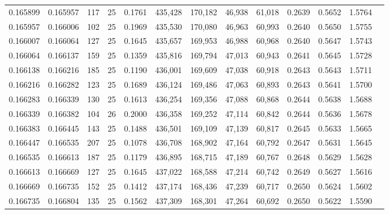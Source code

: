 \begin{tabular}{rrrrrrrrrrrrr}
0.165899 & 0.165957 &   117 &  25 &                                     0.1761 & 435,428 & 170,182 &  46,938 &  61,018 & 0.2639 & 0.5652 & 1.5764 \\
0.165957 & 0.166006 &   102 &  25 &                                     0.1969 & 435,530 & 170,080 &  46,963 &  60,993 & 0.2640 & 0.5650 & 1.5755 \\
0.166007 & 0.166064 &   127 &  25 &                                     0.1645 & 435,657 & 169,953 &  46,988 &  60,968 & 0.2640 & 0.5647 & 1.5743 \\
0.166064 & 0.166137 &   159 &  25 &                                     0.1359 & 435,816 & 169,794 &  47,013 &  60,943 & 0.2641 & 0.5645 & 1.5728 \\
0.166138 & 0.166216 &   185 &  25 &                                     0.1190 & 436,001 & 169,609 &  47,038 &  60,918 & 0.2643 & 0.5643 & 1.5711 \\
0.166216 & 0.166282 &   123 &  25 &                                     0.1689 & 436,124 & 169,486 &  47,063 &  60,893 & 0.2643 & 0.5641 & 1.5700 \\
0.166283 & 0.166339 &   130 &  25 &                                     0.1613 & 436,254 & 169,356 &  47,088 &  60,868 & 0.2644 & 0.5638 & 1.5688 \\
0.166339 & 0.166382 &   104 &  26 &                                     0.2000 & 436,358 & 169,252 &  47,114 &  60,842 & 0.2644 & 0.5636 & 1.5678 \\
0.166383 & 0.166445 &   143 &  25 &                                     0.1488 & 436,501 & 169,109 &  47,139 &  60,817 & 0.2645 & 0.5633 & 1.5665 \\
0.166447 & 0.166535 &   207 &  25 &                                     0.1078 & 436,708 & 168,902 &  47,164 &  60,792 & 0.2647 & 0.5631 & 1.5645 \\
0.166535 & 0.166613 &   187 &  25 &                                     0.1179 & 436,895 & 168,715 &  47,189 &  60,767 & 0.2648 & 0.5629 & 1.5628 \\
0.166613 & 0.166669 &   127 &  25 &                                     0.1645 & 437,022 & 168,588 &  47,214 &  60,742 & 0.2649 & 0.5627 & 1.5616 \\
0.166669 & 0.166735 &   152 &  25 &                                     0.1412 & 437,174 & 168,436 &  47,239 &  60,717 & 0.2650 & 0.5624 & 1.5602 \\
0.166735 & 0.166804 &   135 &  25 &                                     0.1562 & 437,309 & 168,301 &  47,264 &  60,692 & 0.2650 & 0.5622 & 1.5590 \\

\end{tabular}
